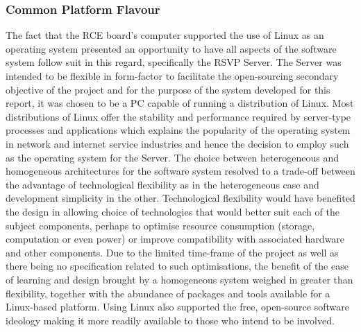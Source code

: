     \subsubsection{Common Platform Flavour}
      The fact that the RCE board's computer supported the use of Linux as an operating system presented an opportunity to have all aspects of the software system follow suit in this regard, specifically the RSVP Server. The Server was intended to be flexible in form-factor to facilitate the open-sourcing secondary objective of the project and for the purpose of the system developed for this report, it was chosen to be a PC capable of running a distribution of Linux. Most distributions of Linux offer the stability and performance required by server-type processes and applications which explains the popularity of the operating system in network and internet service industries \cite{w3techs_Oct2016} and hence the decision to employ such as the operating system for the Server. The choice between heterogeneous and homogeneous architectures for the software system resolved to a trade-off between the advantage of technological flexibility as in the heterogeneous case and development simplicity in the other. Technological flexibility would have benefited the design in allowing choice of technologies that would better suit each of the subject components, perhaps to optimise resource consumption (storage, computation or even power) or improve compatibility with associated hardware and other components. Due to the limited time-frame of the project as well as there being no specification related to such optimisations, the benefit of the ease of learning and design brought by a homogeneous system weighed in greater than flexibility, together with the abundance of packages and tools available for a Linux-based platform. Using Linux also supported the free, open-source software ideology making it more readily available to those who intend to be involved.
      
